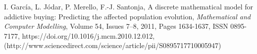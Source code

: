 \documentclass[11pt]{article}
\begin{document}

I. García, L. Jódar, P. Merello, F.-J. Santonja,
 A discrete mathematical model for addictive buying: Predicting the affected population evolution, 
\emph{Mathematical and Computer Modelling},
Volume 54, Issues 7–8,
 2011,
 Pages 1634-1637,
 ISSN 0895-7177,
 https://doi.org/10.1016/j.mcm.2010.12.012,
  (http://www.sciencedirect.com/science/article/pii/S0895717710005947)
\end{document}
